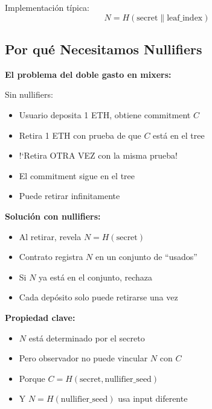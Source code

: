 \documentclass[11pt,a4paper,twoside]{book}
\begin{document}
Implementaci\'on t\'ipica:
\[
N = H(\text{secret} \| \text{leaf\_index})
\]

\subsection{Por qu\'e Necesitamos Nullifiers}

\begin{intuicion}
\textbf{El problema del doble gasto en mixers:}

Sin nullifiers:
\begin{itemize}
    \item Usuario deposita 1 ETH, obtiene commitment $C$
    \item Retira 1 ETH con prueba de que $C$ est\'a en el tree
    \item !`Retira OTRA VEZ con la misma prueba!
    \item El commitment sigue en el tree
    \item Puede retirar infinitamente
\end{itemize}

\textbf{Soluci\'on con nullifiers:}
\begin{itemize}
    \item Al retirar, revela $N = H(\text{secret})$
    \item Contrato registra $N$ en un conjunto de ``usados''
    \item Si $N$ ya est\'a en el conjunto, rechaza
    \item Cada dep\'osito solo puede retirarse una vez
\end{itemize}

\textbf{Propiedad clave:}
\begin{itemize}
    \item $N$ est\'a determinado por el secreto
    \item Pero observador no puede vincular $N$ con $C$
    \item Porque $C = H(\text{secret}, \text{nullifier\_seed})$
    \item Y $N = H(\text{nullifier\_seed})$ usa input diferente
\end{itemize}
\end{intuicion}
\end{document}
